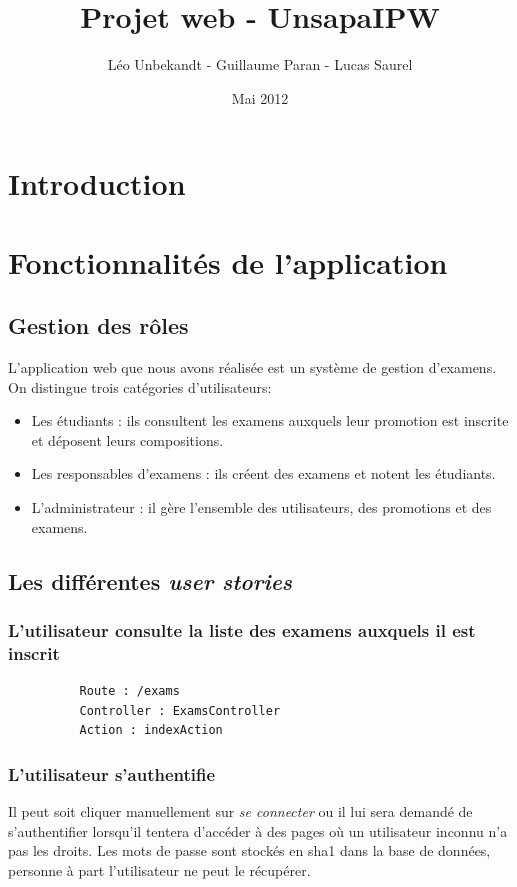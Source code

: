 \documentclass{report}
\author{Léo Unbekandt - Guillaume Paran - Lucas Saurel}
\date{Mai 2012}
\title{Projet web - UnsapaIPW}
\begin{document}
  \maketitle
  \clearpage
  \tableofcontents
  \clearpage

  \section*{Introduction}

  \section{Fonctionnalités de l'application}
    \subsection{Gestion des rôles}
      L'application web que nous avons réalisée est un système de gestion 
      d'examens. On distingue trois catégories d'utilisateurs:

      \begin{itemize}
        \item{Les étudiants : ils consultent les examens auxquels leur promotion 
          est inscrite et déposent leurs compositions.}
        \item{Les responsables d'examens : ils créent des examens et notent les 
          étudiants.}
        \item{L'administrateur : il gère l'ensemble des utilisateurs, des 
          promotions et des examens.}
      \end{itemize}

    \subsection{Les différentes \textsl{user stories}}
      \subsubsection{L'utilisateur consulte la liste des examens auxquels il est inscrit}
        \begin{verbatim}
          Route : /exams 
          Controller : ExamsController
          Action : indexAction
        \end{verbatim}
      \subsubsection{L'utilisateur s'authentifie}
        Il peut soit cliquer manuellement sur \textsl{se connecter} ou il lui sera demandé
        de s'authentifier lorsqu'il tentera d'accéder à des pages où un utilisateur inconnu
        n'a pas les droits. Les mots de passe sont stockés en sha1 dans la base de données,
        personne à part l'utilisateur ne peut le récupérer.
\end{document}
